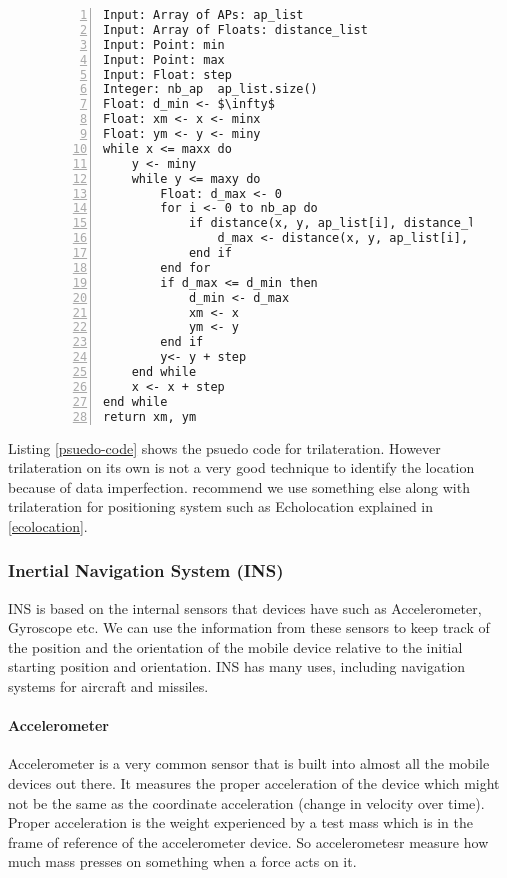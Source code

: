 \begin{figure}[H]
\begin{lstlisting}[caption = {Algorithm for Trilateration\cite{sig-cart}},frame=single,mathescape, captionpos=b,numbers=left,numbersep=5pt,label={psuedo-code}]
Input: Array of APs: ap_list
Input: Array of Floats: distance_list
Input: Point: min
Input: Point: max
Input: Float: step
Integer: nb_ap  ap_list.size()
Float: d_min <- $\infty$
Float: xm <- x <- minx
Float: ym <- y <- miny
while x <= maxx do
    y <- miny
    while y <= maxy do
        Float: d_max <- 0
        for i <- 0 to nb_ap do
            if distance(x, y, ap_list[i], distance_list[i]) > d_max then
                d_max <- distance(x, y, ap_list[i], distance_list[i])
            end if
        end for
        if d_max <= d_min then
            d_min <- d_max
            xm <- x
            ym <- y
        end if
        y<- y + step
    end while
    x <- x + step
end while
return xm, ym
\end{lstlisting}
\end{figure}

Listing \ref{psuedo-code} shows the psuedo code for trilateration. However trilateration on its own is not a very good technique to identify the location because of data imperfection. \citeauthor{trilat-fusion} recommend we use something else along with trilateration for positioning system\cite{trilat-fusion}  such as Echolocation explained in \ref{ecolocation}.
\subsubsection{Inertial Navigation System (INS)}

INS\cite{innertial_nav_sys} is based on the internal sensors that devices have
such as Accelerometer, Gyroscope etc. We can use the information from
these sensors to keep track of the position and the orientation of
the mobile device relative to the initial starting position and orientation. INS has many uses, including navigation systems for
aircraft and missiles\cite{ins-wiki}.


\paragraph{Accelerometer} \label{accelerometer}

Accelerometer\cite{accl-guide} is a very common sensor that is built into almost
all the mobile devices out there. It measures the proper acceleration
of the device which might not be the same as the coordinate acceleration
(change in velocity over time). Proper acceleration is the weight
experienced by a test mass which is in the frame of reference
of the accelerometer device. So accelerometesr measure how much mass
presses on something when a force acts on it.

